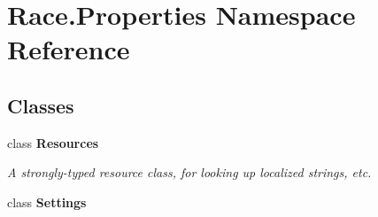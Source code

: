 \hypertarget{namespace_race_1_1_properties}{}\section{Race.\+Properties Namespace Reference}
\label{namespace_race_1_1_properties}
\subsection*{Classes}
\begin{DoxyCompactItemize}
\item 
class {\bfseries Resources}
\begin{DoxyCompactList}\small\item\em A strongly-\/typed resource class, for looking up localized strings, etc. \end{DoxyCompactList}\item 
class {\bfseries Settings}
\end{DoxyCompactItemize}
